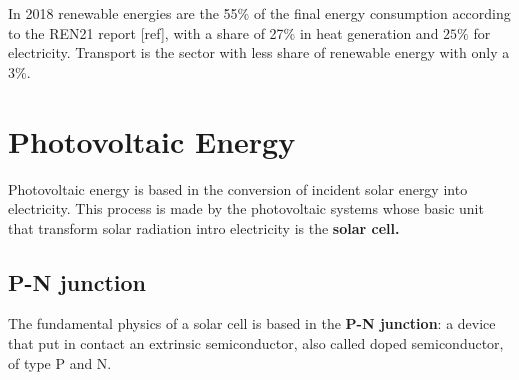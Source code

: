 
In 2018 renewable energies are the 55$\%$ of the final energy consumption according to the REN21 report [ref], with a share of 27$\%$ in heat generation and $25\%$ for electricity. Transport is the sector with less share of renewable energy with only a $3\%$.



\section{Photovoltaic Energy}


Photovoltaic energy is based in the conversion of incident solar energy into electricity. This process is made by the photovoltaic systems whose basic unit that transform solar radiation intro electricity is the \textbf{solar cell.}

\subsection{P-N junction}


The fundamental physics of a solar cell is based in the \textbf{P-N junction}: a device that put in contact an extrinsic semiconductor, also called doped semiconductor, of type P and N.

